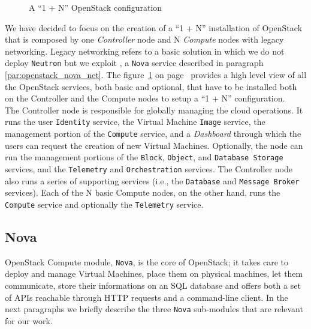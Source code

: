 \begin{figure}[!ht]
\label{fig:openstack_1plusN}
\caption{A ``1 + N'' OpenStack configuration}
\end{figure}

We have decided to focus on the creation of a ``1 + N'' installation of OpenStack that is composed by one \textit{Controller} node and N \textit{Compute} nodes with legacy networking. Legacy networking refers to a basic solution in which we do not deploy \texttt{Neutron} but we exploit , a \texttt{Nova} service described in paragraph \ref{par:openstack_nova_net}. The figure~\ref{fig:openstack_1plusN} on page~\pageref{fig:openstack_1plusN} provides a high level view of all the OpenStack services, both basic and optional, that have to be installed both on the Controller and the Compute nodes to setup a ``1 + N'' configuration.\\ 
The Controller node is responsible for globally managing the cloud operations. It runs the user \texttt{Identity} service, the Virtual Machine \texttt{Image} service, the management portion of the \texttt{Compute} service, and a \textit{Dashboard} through which the users can request the creation of new Virtual Machines. Optionally, the node can run the management portions of the \texttt{Block}, \texttt{Object}, and \texttt{Database Storage} services, and the \texttt{Telemetry} and \texttt{Orchestration} services. The Controller node also runs a series of supporting services (i.e., the \texttt{Database} and \texttt{Message Broker} services). Each of the N basic Compute nodes, on the other hand, runs the \texttt{Compute} service and optionally the \texttt{Telemetry} service.

\subsection{Nova}
\label{sec:openstack_nova}
OpenStack Compute module, \texttt{Nova}, is the core of OpenStack; it takes care to deploy and manage Virtual Machines, place them on physical machines, let them communicate, store their informations on an SQL database and offers both a set of APIs reachable through HTTP requests and a command-line client.
In the next paragraphs we briefly describe the three \texttt{Nova} sub-modules that are relevant for our work.

